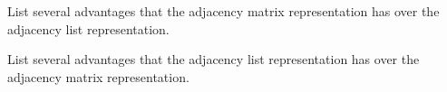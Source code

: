 \begin{pro}
\begin{lenum}
\item
List several advantages that the adjacency matrix representation has over the adjacency list representation.
\item
List several advantages that the adjacency list representation has over the adjacency matrix representation.
\end{lenum}
\end{pro}

